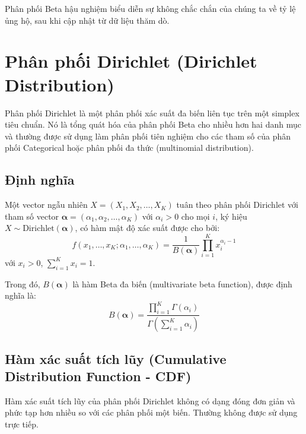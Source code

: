 Phân phối Beta hậu nghiệm biểu diễn sự không chắc chắn của chúng ta về tỷ lệ ủng hộ, sau khi cập nhật từ dữ liệu thăm dò.

\section{Phân phối Dirichlet (Dirichlet Distribution)}
Phân phối Dirichlet là một phân phối xác suất đa biến liên tục trên một simplex tiêu chuẩn. Nó là tổng quát hóa của phân phối Beta cho nhiều hơn hai danh mục và thường được sử dụng làm phân phối tiên nghiệm cho các tham số của phân phối Categorical hoặc phân phối đa thức (multinomial distribution).

\subsection{Định nghĩa}
Một vector ngẫu nhiên $X = (X_1, X_2, \dots, X_K)$ tuân theo phân phối Dirichlet với tham số vector $\boldsymbol{\alpha} = (\alpha_1, \alpha_2, \dots, \alpha_K)$ với $\alpha_i > 0$ cho mọi $i$, ký hiệu $X \sim \text{Dirichlet}(\boldsymbol{\alpha})$, có hàm mật độ xác suất được cho bởi:
\[ f(x_1, \dots, x_K; \alpha_1, \dots, \alpha_K) = \frac{1}{B(\boldsymbol{\alpha})} \prod_{i=1}^K x_i^{\alpha_i-1} \]
với $x_i > 0$, $\sum_{i=1}^K x_i = 1$.

Trong đó, $B(\boldsymbol{\alpha})$ là hàm Beta đa biến (multivariate beta function), được định nghĩa là:
\[ B(\boldsymbol{\alpha}) = \frac{\prod_{i=1}^K \Gamma(\alpha_i)}{\Gamma\left(\sum_{i=1}^K \alpha_i\right)} \]

\subsection{Hàm xác suất tích lũy (Cumulative Distribution Function - CDF)}
Hàm xác suất tích lũy của phân phối Dirichlet không có dạng đóng đơn giản và phức tạp hơn nhiều so với các phân phối một biến. Thường không được sử dụng trực tiếp.

